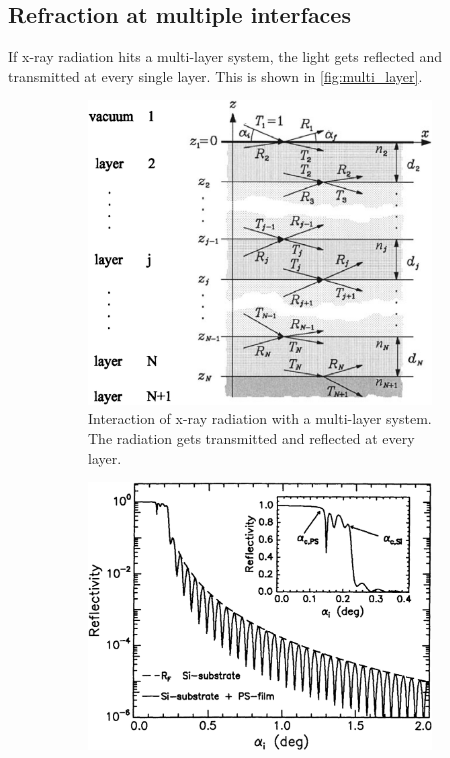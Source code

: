 \subsection{Refraction at multiple interfaces}
If x-ray radiation hits a multi-layer system, the light gets reflected and transmitted at every single layer.
This is shown in \autoref{fig:multi_layer}.
\begin{figure}
    \centering
    \hfill
    \begin{subfigure}{0.47\textwidth}
        \includegraphics[width=\textwidth]{images/multi_layer.png}
        \caption{Interaction of x-ray radiation with a multi-layer system.
        The radiation gets transmitted and reflected at every layer.\\}
        \label{fig:multi_layer}
    \end{subfigure}
    \hfill
    \begin{subfigure}{0.47\textwidth}
        \includegraphics[width=\textwidth]{images/kiessig_oszillation.png}

\end{subfigure}
\end{figure}
